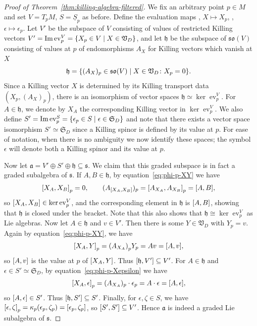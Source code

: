 \documentclass[11pt]{article}
\numberwithin{equation}{section}
\numberwithin{equation}{section}
\newcommand{\fa}{\mathfrak{a}}
\newcommand{\fh}{\mathfrak{h}}
\newcommand{\fs}{\mathfrak{s}}
\newcommand{\fso}{\mathfrak{so}}
\newcommand{\fS}{\mathfrak{S}}
\newcommand{\fV}{\mathfrak{V}}
\newcommand{\Sbundle}{\underline{S}}
\newcommand{\1}{\mathbbm{1}}
\DeclareMathOperator{\evaluate}{ev}
\begin{document}
\begin{proof}[Proof of Theorem~\ref{thm:killing-algebra-filtered}]	
	We fix an arbitrary point $p\in M$ and set $V=T_pM$, $S=\Sbundle_p$ as before. Define the evaluation maps
\smash{$\evaluate^V_p\colon \fV_D \to V$}, $X\mapsto X_p$,
\smash{$\evaluate^S_p\colon \fS_D \to S$}, $\epsilon\mapsto \epsilon_p$.
	Let $V'$ be the subspace of $V$ consisting of values of restricted Killing vectors
$V' = \Im\evaluate^V_p = \qty{X_p\in V \mid X\in\fV_D }$,
	and let $\fh$ be the subspace of $\fso(V)$ consisting of values at $p$ of endomorphisms $A_X$ for Killing vectors which vanish at $X$
	\[
		\fh = \qty{(A_X)_p\in\fso(V) \mid X\in\fV_D\colon X_p=0}.
	\]
	Since a Killing vector $X$ is determined by its Killing transport data $(X_p,(A_X)_p)$, there is an isomorphism of vector spaces $\fh\simeq \ker\evaluate^V_p$. For $A\in\fh$, we denote by $X_A$ the corresponding Killing vector in $\ker\evaluate^V_p$. We also define
$S' = \Im\evaluate^S_p = \qty{\epsilon_p\in S \mid \epsilon\in\fS_D}
$
	and note that there exists a vector space isomorphism $S'\simeq \fS_D$ since a Killing spinor is defined by its value at $p$. For ease of notation, when there is no ambiguity we now identify these spaces; the symbol $\epsilon$ will denote both a Killing spinor and its value at $p$.
	
	Now let $\fa = V'\oplus S'\oplus\fh \subseteq \fs$. We claim that this graded subspace is in fact a graded subalgebra of $\fs$. If $A,B\in\fh$, by equation~\eqref{eq:phi-p-XY} we have
	\begin{gather*}
		\comm{X_A}{X_B}_p = 0,\qquad
		(A_{\comm{X_A}{X_B}})_p = \comm{A_{X_A}}{A_{X_B}}_p = \comm{A}{B},
	\end{gather*}
	so $\comm{X_A}{X_B}\in\ker\evaluate^V_p$, and the corresponding element in $\fh$ is $\comm{A}{B}$, showing that $\fh$ is closed under the bracket. Note that this also shows that $\fh\cong\ker\evaluate^V_p$ as Lie algebras. Now let $A\in\fh$ and $v\in V'$. Then there is some $Y\in\fV_D$ with $Y_p=v$. Again by equation~\eqref{eq:phi-p-XY}, we have
	\[
		\comm{X_A}{Y}_p = \qty(A_{X_A})_p Y_p = A v = \comm{A}{v},
	\]
	so $\comm{A}{v}$ is the value at $p$ of $\comm{X_A}{Y}$. Thus $\comm{\fh}{V'}\subseteq V'$. For $A\in\fh$ and $\epsilon\in S'\simeq\fS_D$, by equation~\eqref{eq:phi-p-Xepsilon} we have
	\[
		\comm{X_A}{\epsilon}_p = (A_{X_A})_p\cdot\epsilon_p = A\cdot\epsilon = \comm{A}{\epsilon},
	\]
	so $\comm{A}{\epsilon}\in S'$. Thus $\comm{\fh}{S'}\subseteq S'$. Finally, for $\epsilon,\zeta\in S$, we have
$\comm{\epsilon}{\zeta}_p
			= \kappa_p(\epsilon_p,\zeta_p)
			= \comm{\epsilon_p}{\zeta_p}$,
	so $\comm{S'}{S'}\subseteq V'$. Hence $\fa$ is indeed a graded Lie subalgebra of $\fs$.
	

\end{proof}
\end{document}
